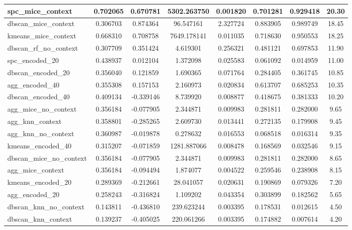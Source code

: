 \begin{table}[H]
{\begin{tabular}{|l|c|c|c|c|c|c|c|}
spc\_mice\_context & 0.702065 & 0.670781 & 5302.263750 & 0.001820 & 0.701281 & 0.929418 & 20.30 \\ \hline
dbscan\_mice\_context & 0.306703 & 0.874364 & 96.547161 & 2.327724 & 0.883905 & 0.989749 & 18.45 \\ \hline
kmeans\_mice\_context & 0.668310 & 0.708758 & 7649.178141 & 0.011035 & 0.718630 & 0.950553 & 18.25 \\ \hline
dbscan\_rf\_no\_context & 0.307709 & 0.351424 & 4.619301 & 0.256321 & 0.481121 & 0.697853 & 11.90 \\ \hline
spc\_encoded\_20 & 0.438937 & 0.012104 & 1.372098 & 0.025583 & 0.061092 & 0.014959 & 11.00 \\ \hline
dbscan\_encoded\_20 & 0.356040 & 0.121859 & 1.690365 & 0.071764 & 0.284405 & 0.361745 & 10.85 \\ \hline
agg\_encoded\_40 & 0.355308 & 0.157153 & 2.160973 & 0.020834 & 0.613707 & 0.685253 & 10.35 \\ \hline
dbscan\_encoded\_40 & 0.409134 & -0.339146 & 8.739920 & 0.008877 & 0.418675 & 0.381333 & 10.20 \\ \hline
agg\_mice\_no\_context & 0.356184 & -0.077905 & 2.344871 & 0.009983 & 0.281811 & 0.282000 & 9.65 \\ \hline
agg\_knn\_context & 0.358801 & -0.285265 & 2.609730 & 0.013441 & 0.272135 & 0.179908 & 9.45 \\ \hline
agg\_knn\_no\_context & 0.360987 & -0.019878 & 0.278632 & 0.016553 & 0.068518 & 0.016314 & 9.35 \\ \hline
kmeans\_encoded\_40 & 0.315207 & -0.071859 & 1281.887066 & 0.008478 & 0.168569 & 0.032546 & 9.15 \\ \hline
dbscan\_mice\_no\_context & 0.356184 & -0.077905 & 2.344871 & 0.009983 & 0.281811 & 0.282000 & 8.65 \\ \hline
agg\_mice\_context & 0.356184 & -0.094494 & 1.874077 & 0.004522 & 0.259546 & 0.238908 & 8.15 \\ \hline
kmeans\_encoded\_20 & 0.289369 & -0.212661 & 28.041057 & 0.020631 & 0.190869 & 0.079326 & 7.20 \\ \hline
agg\_encoded\_20 & 0.258243 & -0.316824 & 1.109202 & 0.043354 & 0.303899 & 0.182562 & 5.65 \\ \hline
dbscan\_knn\_no\_context & 0.143811 & -0.436810 & 239.623244 & 0.003395 & 0.178531 & 0.012615 & 4.50 \\ \hline
dbscan\_knn\_context & 0.139237 & -0.405025 & 220.061266 & 0.003395 & 0.174882 & 0.007614 & 4.20 \\ \hline
\end{tabular}
}
\end{table}

